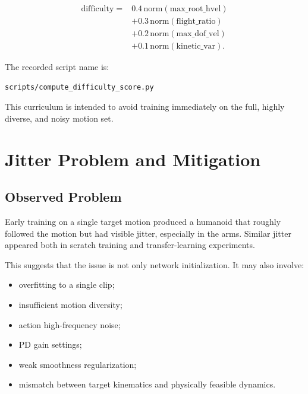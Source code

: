 \documentclass[11pt,a4paper]{article}
\begin{document}
\begin{equation}
    \begin{aligned}
        \mathrm{difficulty} ={} &
        0.4\,\mathrm{norm}(\mathrm{max\_root\_hvel})                           \\
                                & + 0.3\,\mathrm{norm}(\mathrm{flight\_ratio}) \\
                                & + 0.2\,\mathrm{norm}(\mathrm{max\_dof\_vel}) \\
                                & + 0.1\,\mathrm{norm}(\mathrm{kinetic\_var}).
    \end{aligned}
\end{equation}

The recorded script name is:

\begin{lstlisting}
scripts/compute_difficulty_score.py
\end{lstlisting}

This curriculum is intended to avoid training immediately on the full, highly diverse, and noisy motion set.

\section{Jitter Problem and Mitigation}

\subsection{Observed Problem}

Early training on a single target motion produced a humanoid that roughly followed the motion but had visible jitter, especially in the arms. Similar jitter appeared both in scratch training and transfer-learning experiments.

This suggests that the issue is not only network initialization. It may also involve:

\begin{itemize}[leftmargin=2em]
    \item overfitting to a single clip;
    \item insufficient motion diversity;
    \item action high-frequency noise;
    \item PD gain settings;
    \item weak smoothness regularization;
    \item mismatch between target kinematics and physically feasible dynamics.
\end{itemize}
\end{document}
